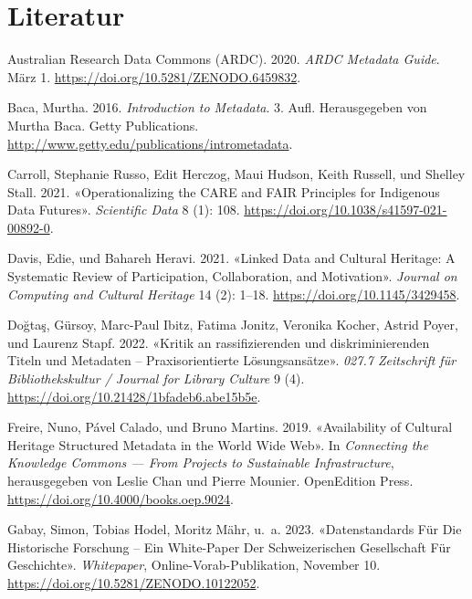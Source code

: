 \documentclass[
  nswissgerman,
  letterpaper,
  DIV=11,
  numbers=noendperiod]{scrartcl}
\newlength{\cslhangindent}
\newenvironment{CSLReferences}[2] %
 {\begin{list}{}{%
  \setlength{\itemindent}{0pt}
  \setlength{\leftmargin}{0pt}
  \setlength{\parsep}{0pt}
  \ifodd #1
   \setlength{\leftmargin}{\cslhangindent}
   \setlength{\itemindent}{-1\cslhangindent}
  \fi
  \setlength{\itemsep}{#2\baselineskip}}}
 {\end{list}}
\begin{document}
\section{Literatur}\label{literatur}

\protect{}\label{refs}
\begin{CSLReferences}{1}{1}
Australian Research Data Commons (ARDC). 2020. \emph{{ARDC Metadata
Guide}}. März 1. \url{https://doi.org/10.5281/ZENODO.6459832}.

Baca, Murtha. 2016. \emph{Introduction to Metadata}. 3. Aufl.
Herausgegeben von Murtha Baca. Getty Publications.
\url{http://www.getty.edu/publications/intrometadata}.

Carroll, Stephanie Russo, Edit Herczog, Maui Hudson, Keith Russell, und
Shelley Stall. 2021. {«Operationalizing the {CARE} and {FAIR Principles}
for {Indigenous} Data Futures»}. \emph{Scientific Data} 8 (1): 108.
\url{https://doi.org/10.1038/s41597-021-00892-0}.

Davis, Edie, und Bahareh Heravi. 2021. {«Linked {Data} and {Cultural
Heritage}: {A Systematic Review} of {Participation}, {Collaboration},
and {Motivation}»}. \emph{Journal on Computing and Cultural Heritage} 14
(2): 1--18. \url{https://doi.org/10.1145/3429458}.

Doğtaş, Gürsoy, Marc-Paul Ibitz, Fatima Jonitz, Veronika Kocher, Astrid
Poyer, und Laurenz Stapf. 2022. {«Kritik an rassifizierenden und
diskriminierenden Titeln und Metadaten -- Praxisorientierte
Lösungsansätze»}. \emph{027.7 Zeitschrift für Bibliothekskultur /
Journal for Library Culture} 9 (4).
\url{https://doi.org/10.21428/1bfadeb6.abe15b5e}.

Freire, Nuno, Pável Calado, und Bruno Martins. 2019. {«Availability of
{Cultural Heritage Structured Metadata} in the {World Wide Web}»}. In
\emph{Connecting the {Knowledge Commons} --- {From Projects} to
{Sustainable Infrastructure}}, herausgegeben von Leslie Chan und Pierre
Mounier. OpenEdition Press.
\url{https://doi.org/10.4000/books.oep.9024}.

Gabay, Simon, Tobias Hodel, Moritz Mähr, u.~a. 2023. {«Datenstandards
Für Die Historische {Forschung} -- {Ein White-Paper} Der
{Schweizerischen Gesellschaft} Für {Geschichte}»}. \emph{Whitepaper},
Online-Vorab-Publikation, November 10.
\url{https://doi.org/10.5281/ZENODO.10122052}.


\end{CSLReferences}
\end{document}

